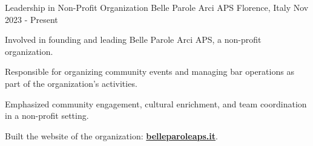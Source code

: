 

\begin{cventries}


  \cventry
    {Leadership in Non-Profit Organization} %
    {Belle Parole Arci APS} %
    {Florence, Italy} %
    {Nov 2023 - Present} %
    {
      \begin{cvitems} %
        \item {Involved in founding and leading Belle Parole Arci APS, a non-profit organization.}
        \item {Responsible for organizing community events and managing bar operations as part of the organization's activities.}
        \item{Emphasized community engagement, cultural enrichment, and team coordination in a non-profit setting.}
        \item{Built the website of the organization: \href{http://belleparoleaps.it}{\textbf{belleparoleaps.it}}}.
      \end{cvitems}
    }



\end{cventries}

